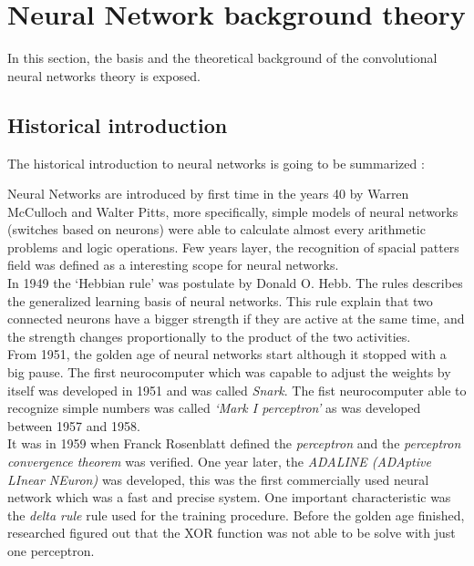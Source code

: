 \section{Neural Network background theory}
In this section, the basis and the theoretical background of the convolutional neural networks theory is exposed.\\

\subsection{Historical introduction}
The historical introduction to neural networks is going to be summarized \cite{BINN}:

Neural Networks are introduced by first time in the years 40 by Warren McCulloch and Walter Pitts, more specifically, simple models of neural networks (switches based on neurons) were able to calculate almost every arithmetic problems and logic operations. Few years layer, the recognition of spacial patters field was defined as a interesting scope for neural networks.\\

In 1949 the `Hebbian rule' was postulate by Donald O. Hebb. The rules describes the generalized learning basis of neural networks. This rule explain that two connected neurons have  a bigger strength if they are active at the same time, and the strength changes proportionally to the product of the two activities.\\

From 1951, the golden age of neural networks start although it stopped with a big pause. The first neurocomputer which was capable to adjust the weights by itself was developed in 1951 and was called \textit{Snark}. The fist neurocomputer able to recognize simple numbers was called \textit{`Mark I perceptron'} as was developed between 1957 and 1958.\\

It was in 1959 when Franck Rosenblatt  defined the \textit{perceptron} and the \textit{perceptron convergence theorem} was verified. One year later, the \textit{ADALINE (ADAptive LInear NEuron)} was developed, this was the first commercially used neural network which was a fast and precise system. One important characteristic was the \textit{delta rule} rule used for the training procedure. Before the golden age finished, researched figured out that the XOR function was not able to be solve with just one perceptron.\\

